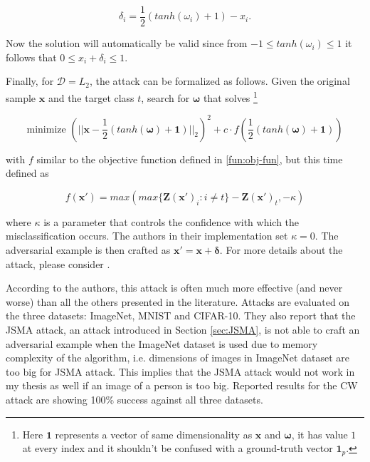 \[
\delta_i = \frac{1}{2}(tanh(\omega_i) + 1) - x_i.
\] 

Now the solution will automatically be valid since from $-1 \leq tanh(\omega_i) \leq 1$ it follows that $0 \leq x_i + \delta_i \leq 1$.

Finally, for $\mathcal{D} = L_2$, the attack can be formalized as follows. Given the original sample $\pmb x$ and the target class $t$, search for $\pmb \omega$ that solves \footnote{Here $\pmb 1$ represents a vector of same dimensionality as $\pmb x$ and $\pmb \omega$, it has value $1$ at every index and it shouldn't be confused with a ground-truth vector $\pmb 1_p$. }

\[
\text{minimize  }(||\pmb x - \frac{1}{2}(tanh(\pmb \omega) + \pmb 1)||_2)^2 + c \cdot  f(\frac{1}{2}(tanh(\pmb \omega) + \pmb 1))
\]

with $f$ similar to the objective function defined in \ref{fun:obj-fun}, but this time defined as

\[
f(\pmb x') = max(max\{\pmb Z(\pmb x ')_i : i \neq t\} - \pmb Z(\pmb x')_t, - \kappa)
\]

where $\kappa$ is a parameter that controls the confidence with which the misclassification occurs. The authors in their implementation set $\kappa = 0$. The adversarial example is then crafted as $\pmb x' = \pmb x + \pmb \delta$. For more details about the attack, please consider \cite{DBLP:journals/corr/CarliniW16a}.

According to the authors, this attack is often much more effective (and never worse) than all the others presented in the literature. Attacks are evaluated on the three datasets: ImageNet, MNIST and CIFAR-10. They also report that the JSMA attack, an attack introduced in Section \ref{sec:JSMA}, is not able to craft an adversarial example when the ImageNet dataset is used due to memory complexity of the algorithm, i.e. dimensions of images in ImageNet dataset are too big for JSMA attack. This implies that the JSMA attack would not work in my thesis as well if an image of a person is too big. Reported results for the CW attack are showing 100\% success against all three datasets.







